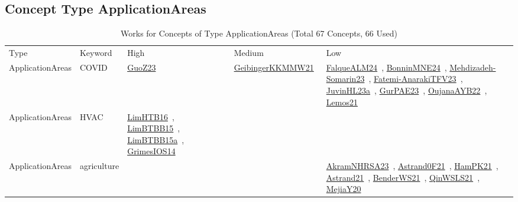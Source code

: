 \clearpage
\subsection{Concept Type ApplicationAreas}
\label{sec:ApplicationAreas}
\label{ApplicationAreas}
{\scriptsize
\begin{longtable}{lp{3cm}>{\raggedright\arraybackslash}p{6cm}>{\raggedright\arraybackslash}p{6cm}>{\raggedright\arraybackslash}p{8cm}}
\rowcolor{white}\caption{Works for Concepts of Type ApplicationAreas (Total 67 Concepts, 66 Used)}\\ \toprule
\rowcolor{white}Type & Keyword & High & Medium & Low\\ \midrule\endhead
\bottomrule
\endfoot
\index{COVID}\index{ApplicationAreas!COVID}ApplicationAreas & COVID & \href{../works/GuoZ23.pdf}{GuoZ23}~\cite{GuoZ23} & \href{../works/GeibingerKKMMW21.pdf}{GeibingerKKMMW21}~\cite{GeibingerKKMMW21} & \href{../works/FalqueALM24.pdf}{FalqueALM24}~\cite{FalqueALM24}, \href{../works/BonninMNE24.pdf}{BonninMNE24}~\cite{BonninMNE24}, \href{../works/Mehdizadeh-Somarin23.pdf}{Mehdizadeh-Somarin23}~\cite{Mehdizadeh-Somarin23}, \href{../works/Fatemi-AnarakiTFV23.pdf}{Fatemi-AnarakiTFV23}~\cite{Fatemi-AnarakiTFV23}, \href{../works/JuvinHL23a.pdf}{JuvinHL23a}~\cite{JuvinHL23a}, \href{../works/GurPAE23.pdf}{GurPAE23}~\cite{GurPAE23}, \href{../works/OujanaAYB22.pdf}{OujanaAYB22}~\cite{OujanaAYB22}, \href{../works/Lemos21.pdf}{Lemos21}~\cite{Lemos21}\\
\index{HVAC}\index{ApplicationAreas!HVAC}ApplicationAreas & HVAC & \href{../works/LimHTB16.pdf}{LimHTB16}~\cite{LimHTB16}, \href{../works/LimBTBB15.pdf}{LimBTBB15}~\cite{LimBTBB15}, \href{../works/LimBTBB15a.pdf}{LimBTBB15a}~\cite{LimBTBB15a}, \href{../works/GrimesIOS14.pdf}{GrimesIOS14}~\cite{GrimesIOS14} &  & \\
\index{agriculture}\index{ApplicationAreas!agriculture}ApplicationAreas & agriculture &  &  & \href{../works/AkramNHRSA23.pdf}{AkramNHRSA23}~\cite{AkramNHRSA23}, \href{../works/Astrand0F21.pdf}{Astrand0F21}~\cite{Astrand0F21}, \href{../works/HamPK21.pdf}{HamPK21}~\cite{HamPK21}, \href{../works/Astrand21.pdf}{Astrand21}~\cite{Astrand21}, \href{../works/BenderWS21.pdf}{BenderWS21}~\cite{BenderWS21}, \href{../works/QinWSLS21.pdf}{QinWSLS21}~\cite{QinWSLS21}, \href{../works/MejiaY20.pdf}{MejiaY20}~\cite{MejiaY20}\\

\end{longtable}}
